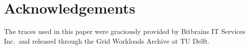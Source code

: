 \documentclass[11pt,a4paper]{article}
\begin{document}
\section*{Acknowledgements}

The traces used in this paper were graciously provided by
Bitbrains IT Services Inc.\ and released through the Grid Workloads Archive
at TU Delft.



\end{document}
